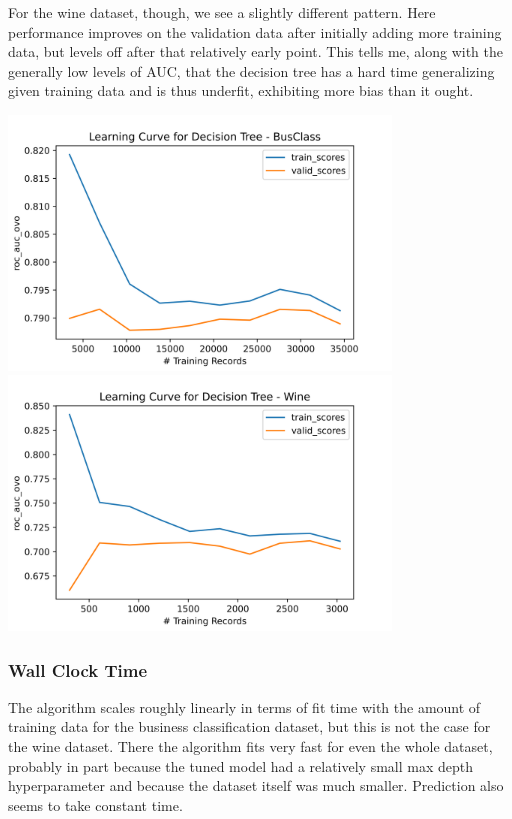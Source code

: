 \documentclass[
	letterpaper, %
]{jdf}
\begin{document}
For the wine dataset, though, we see a slightly different pattern. Here performance improves on the validation data after initially adding more training data, but levels off after that relatively early point. This tells me, along with the generally low levels of AUC, that the decision tree has a hard time generalizing given training data and is thus underfit, exhibiting more bias than it ought.

\includegraphics[width=4in]{Figures/BusClass-0920/DT/learn_curve.png}
\includegraphics[width=4in]{Figures/Wine-0921/DT/learn_curve.png}

\subsubsection{Wall Clock Time}

The algorithm scales roughly linearly in terms of fit time with the amount of training data for the business classification dataset, but this is not the case for the wine dataset. There the algorithm fits very fast for even the whole dataset, probably in part because the tuned model had a relatively small max depth hyperparameter and because the dataset itself was much smaller. Prediction also seems to take constant time.
\end{document}
